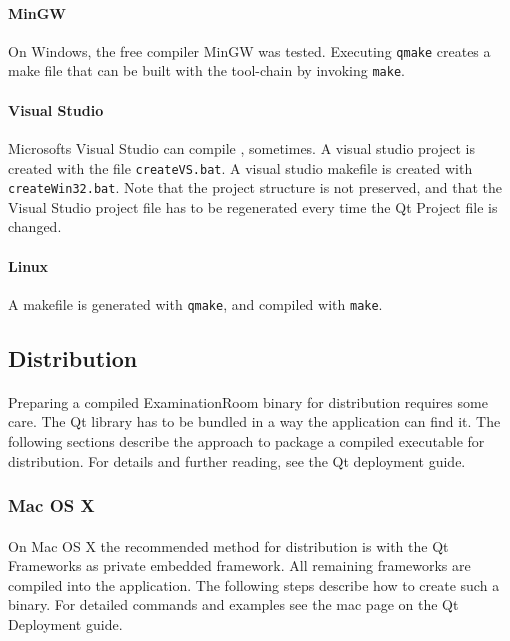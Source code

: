 \paragraph{MinGW}
On Windows, the free compiler MinGW was tested.
Executing \texttt{qmake} creates a make file that can be built with the tool-chain by invoking \texttt{make}.

\paragraph{Visual Studio}
Microsofts Visual Studio can compile \ER, sometimes.
A visual studio project is created with the file \texttt{createVS.bat}.
A visual studio makefile is created with \texttt{createWin32.bat}.
Note that the project structure is not preserved, and that the Visual Studio project file has to be regenerated every time the Qt Project file is changed.

\paragraph{Linux}
A makefile is generated with \texttt{qmake}, and compiled with \texttt{make}.


\subsection{Distribution}
\paragraph{}
Preparing a compiled ExaminationRoom binary for distribution requires some care.
The Qt library has to be bundled in a way the application can find it.
The following sections describe the approach to package a compiled executable for distribution.
For details and further reading, see the Qt deployment guide\cite{deployment}.

\subsubsection{Mac OS X}
\paragraph{}
On Mac OS X the recommended method for distribution is with the Qt Frameworks as private embedded framework.
All remaining frameworks are compiled into the application.
The following steps describe how to create such a binary.
For detailed commands and examples see the mac page on the Qt Deployment guide\cite{deployment}.

